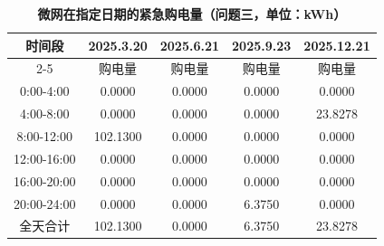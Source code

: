 \begin{table}[h]
\centering
\caption{\textbf{微网在指定日期的紧急购电量（问题三，单位：kWh）}}
\label{tab:q3_emg}
\begin{tabular}{|c|c|c|c|c|}
\hline
\multirow{2}{*}{时间段} & \multicolumn{1}{c|}{2025.3.20} & \multicolumn{1}{c|}{2025.6.21} & \multicolumn{1}{c|}{2025.9.23} & \multicolumn{1}{c|}{2025.12.21} \\
\cline{2-5}
 & 购电量 & 购电量 & 购电量 & 购电量 \\
\hline
0:00-4:00 & 0.0000 & 0.0000 & 0.0000 & 0.0000 \\
\hline
4:00-8:00 & 0.0000 & 0.0000 & 0.0000 & 23.8278 \\
\hline
8:00-12:00 & 102.1300 & 0.0000 & 0.0000 & 0.0000 \\
\hline
12:00-16:00 & 0.0000 & 0.0000 & 0.0000 & 0.0000 \\
\hline
16:00-20:00 & 0.0000 & 0.0000 & 0.0000 & 0.0000 \\
\hline
20:00-24:00 & 0.0000 & 0.0000 & 6.3750 & 0.0000 \\
\hline
全天合计 & 102.1300 & 0.0000 & 6.3750 & 23.8278 \\
\hline
\end{tabular}
\end{table}
